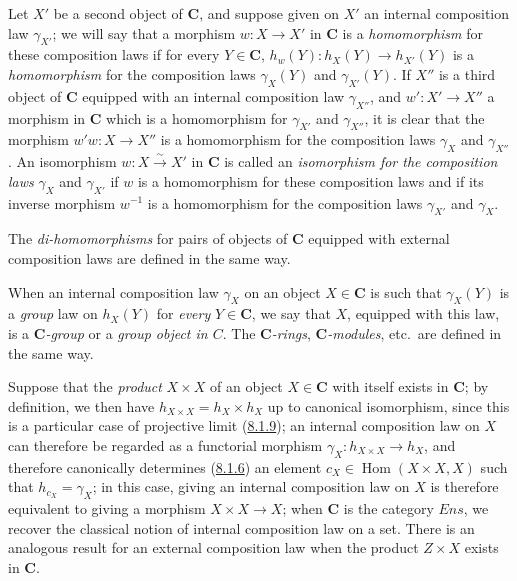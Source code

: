 \begin{env}[8.2.2]
\label{0.8.2.2}
Let $X'$ be a second object of $\boldsymbol{C}$, and suppose given on $X'$ an internal
composition law $\gamma_{X'}$; we will say that a morphism
$w:X\to X'$ in $\boldsymbol{C}$ is a \emph{homomorphism} for these composition
laws if for every $Y\in\boldsymbol{C}$, $h_w(Y):h_X(Y)\to h_{X'}(Y)$ is a
\emph{homomorphism} for the composition laws $\gamma_X(Y)$ and
$\gamma_{X'}(Y)$. If $X''$ is a third
object of $\boldsymbol{C}$ equipped with an internal composition law $\gamma_{X''}$, and
$w':X'\to X''$ a morphism in $\boldsymbol{C}$ which is a homomorphism for
$\gamma_{X'}$ and $\gamma_{X''}$, it is clear that the morphism
$w'w:X\to X''$ is a homomorphism for the composition laws $\gamma_X$
and $\gamma_{X''}$. An isomorphism $w:X\xrightarrow{\sim}X'$ in $\boldsymbol{C}$ is
called an \emph{isomorphism for the composition laws} $\gamma_X$ and
$\gamma_{X'}$ if $w$ is a homomorphism for these composition laws and
if its inverse morphism $w^{-1}$ is a homomorphism for the composition
laws $\gamma_{X'}$ and $\gamma_X$.

The \emph{di-homomorphisms} for pairs of objects of $\boldsymbol{C}$ equipped with
external composition laws are defined in the same way.
\end{env}

\begin{env}[8.2.3]
\label{0.8.2.3}
When an internal composition law $\gamma_X$ on an object $X\in \boldsymbol{C}$ is
such that $\gamma_X(Y)$ is a \emph{group} law on $h_X(Y)$ for
\emph{every} $Y\in \boldsymbol{C}$, we say that $X$, equipped with this law, is a
\emph{$\boldsymbol{C}$-group} or a \emph{group object in $C$}. The
\emph{$\boldsymbol{C}$-rings}, \emph{$\boldsymbol{C}$-modules}, etc.\ are defined in the same way.
\end{env}

\begin{env}[8.2.4]
\label{0.8.2.4}
Suppose that the \emph{product} $X\times X$ of an object $X\in \boldsymbol{C}$ with itself
exists in $\boldsymbol{C}$; by definition, we then have
$h_{X\times X}=h_X\times h_X$ up to canonical isomorphism, since this is
a particular case of projective limit
(\hyperref[0.8.1.9]{8.1.9}); an internal composition law on $X$ can
therefore be regarded as a functorial morphism
$\gamma_X:h_{X\times X}\to h_X$, and therefore canonically determines
(\hyperref[0.8.1.6]{8.1.6}) an element
$c_X\in\operatorname{Hom}(X\times X,X)$ such that $h_{c_X}=\gamma_X$; in
this case, giving an internal composition law on $X$ is therefore
equivalent to giving a morphism $X\times X\to X$; when $\boldsymbol{C}$ is the
category $\boldsymbol{\mathit{Ens}}$, we recover the classical notion of internal
composition law on a set. There is an analogous result for an external
composition law when the product $Z\times X$ exists in $\boldsymbol{C}$.
\end{env}


